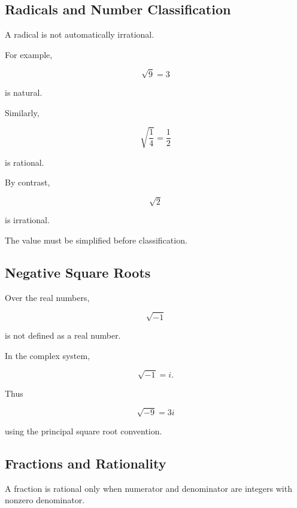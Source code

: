 \subsection{Radicals and Number Classification}
\label{subsec:radicals-number-classification}

A radical is not automatically irrational.

For example,

\[
\boxed{
\sqrt9=3
}
\]

is natural.

Similarly,

\[
\boxed{
\sqrt{\frac14}
=
\frac12
}
\]

is rational.

By contrast,

\[
\boxed{
\sqrt2
}
\]

is irrational.

The value must be simplified before classification.

\subsection{Negative Square Roots}
\label{subsec:negative-square-root-classification}

Over the real numbers,

\[
\sqrt{-1}
\]

is not defined as a real number.

In the complex system,

\[
\boxed{
\sqrt{-1}=i.
}
\]

Thus

\[
\boxed{
\sqrt{-9}=3i
}
\]

using the principal square root convention.

\subsection{Fractions and Rationality}
\label{subsec:fractions-rationality-reference}

A fraction is rational only when numerator and denominator are integers with
nonzero denominator.

